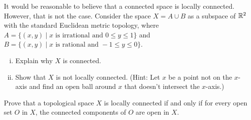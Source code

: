 \item It would be reasonable to believe that a connected space is locally connected. However, that is not the case. Consider the space $X = A \cup B$ as a subspace of $\mathbb{R}^2$ with the standard Euclidean metric topology, where $A = \{(x,y) \mid x \text{ is irrational and } 0 \leq y \leq 1\}$ and $B = \{(x,y) \mid x \text{ is rational and } -1 \leq y \leq 0\}$.  
	\begin{enumerate}[i.]
	\item Explain why $X$ is connected.
	
	\item Show that $X$ is not locally connected. (Hint: Let $x$ be a point not on the $x$-axis and find an open ball around $x$ that doesn't intersect the $x$-axis.)
	
	\end{enumerate}
	

\item Prove that a topological space $X$ is locally connected if and only if for every open set $O$ in $X$, the connected components of $O$ are open in $X$.  

\ea

